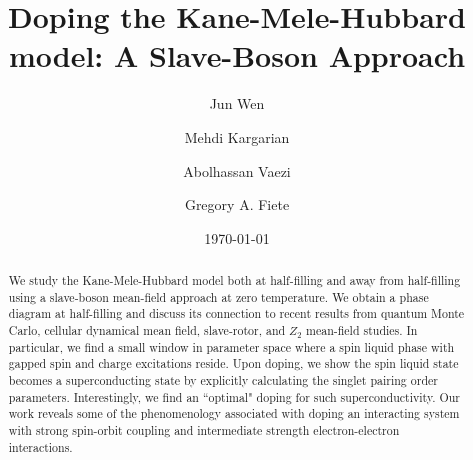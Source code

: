 \documentclass[aps,prb,twocolumn,superscriptaddress,showpacs]{revtex4-1}
\begin{document}
\title{Doping the Kane-Mele-Hubbard model: A Slave-Boson Approach}

\author{Jun Wen}

\author{Mehdi Kargarian}

\author{Abolhassan Vaezi}

\author{Gregory A. Fiete}

\begin{abstract}
We study the Kane-Mele-Hubbard model both at half-filling and away from half-filling using a slave-boson mean-field approach at zero temperature. We obtain a phase diagram at half-filling and discuss its connection to recent results from quantum Monte Carlo, cellular dynamical mean field, slave-rotor, and $Z_2$  mean-field studies. In particular, we find a small window in parameter space where a spin liquid phase with gapped spin and charge excitations reside. Upon doping, we show the spin liquid state becomes a superconducting state by explicitly calculating the singlet pairing order parameters. Interestingly, we find an ``optimal" doping for such superconductivity. Our work reveals some of the phenomenology associated with doping an interacting system with strong spin-orbit coupling and intermediate strength electron-electron interactions.

\end{abstract}
\date{\today}



\maketitle
\end{document}
